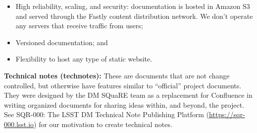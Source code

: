 \begin{itemize}
	\item High reliability, scaling, and security: documentation is hosted in Amazon S3 and served through the Fastly content distribution network. We don't operate any servers that receive traffic from users;
	\item Versioned documentation; and
	\item Flexibility to host any type of static website.
\end{itemize}

{\bf Technical notes (technotes):}  These are documents that are not change controlled, but otherwise have features similar to ``official'' project documents.
They were designed by the DM SQuaRE team as a replacement for Confluence in writing organized documents for sharing ideas within, and beyond, the project.
See SQR-000: The LSST DM Technical Note Publishing Platform (\url{https://sqr-000.lsst.io}) for our motivation to create technical notes. 
